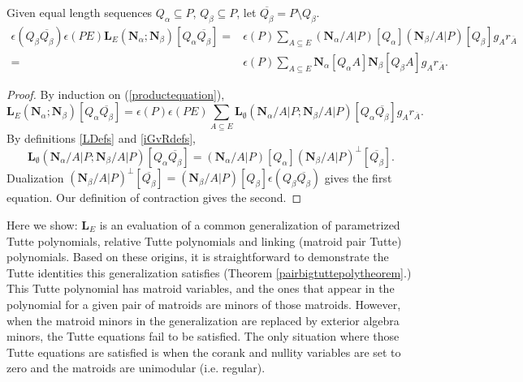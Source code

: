 \documentclass[Unicode]{cedram-alco}
\newcommand{\ext}[1]{\ensuremath{\mathbf{#1}}}
\newcommand{\eNal}{\ensuremath{\ext{N}_{\alpha}}}
\newcommand{\eNbe}{\ensuremath{\ext{N}_\beta}}
\newcommand{\extLHorSub}[3]{\ext{L}_{#1}\left(  {#2}; {#3}  \right)}
\begin{document}
\begin{coro}\label{commonbasescoro}
  Given 
  equal length sequences $Q_\alpha \subseteq P$, $Q_\beta \subseteq P$,
  let $\overline{Q_\beta}=P\setminus Q_\beta$.
\label{common-basis-expansion}
\begin{equation}
  \begin{split}
    \epsilon(  Q_\beta \overline{Q_\beta} )\epsilon(PE)
    \extLHorSub{E}{\eNal}{\eNbe}  [Q_{\alpha}\overline{Q_{\beta}}]
    =& 
    \epsilon(P)\sum_{A\subseteq E}
    (\ext{N}_\alpha/A|P) [Q_\alpha]
    (\ext{N}_\beta/A|P) [Q_\beta] g_Ar_{\overline{A}} \\
    =& 
    \epsilon(P)\sum_{A\subseteq E}
    \ext{N}_\alpha[Q_\alpha A]
    \ext{N}_\beta [Q_\beta A]
    g_Ar_{\overline{A}}.
  \end{split}
\end{equation}

\end{coro}


\begin{proof}
  By induction on (\ref{productequation}),
  \[
  \extLHorSub{E}{\eNal}{\eNbe}  [Q_{\alpha}\overline{Q_{\beta}}] = \epsilon(P)\epsilon(PE)
  \sum_{A\subseteq E}\extLHorSub{\emptyset}{\ext{N}_\alpha/A|P}{\ext{N}_\beta/A|P}[Q_{\alpha}\overline{Q_{\beta}}]
  g_Ar_{\overline{A}}.
  \]
By definitions \ref{LDefs} and \ref{iGvRdefs}, 
  \[
\extLHorSub{\emptyset}{\ext{N}_\alpha/A|P}{\ext{N}_\beta/A|P}[Q_{\alpha}\overline{Q_{\beta}}]
=(\ext{N}_\alpha/A|P)[Q_\alpha](\ext{N}_\beta/A|P)^\perp[\overline{Q_{\beta}}].
\]
Dualization
$(\ext{N}_\beta/A|P)^\perp[\overline{Q_{\beta}}]=
(\ext{N}_\beta/A|P)[Q_{\beta}]\epsilon(Q_{\beta}\overline{Q_{\beta}})$
gives the first equation.
Our definition of contraction gives the second.
\end{proof}





Here we show:  $\ext{L}_E$ is an evaluation of a common generalization
of parametrized Tutte polynomials, relative Tutte polynomials and linking
(matroid pair Tutte) polynomials.
Based on these origins, it is straightforward to demonstrate the Tutte
identities this generalization satisfies (Theorem \ref{pairbigtuttepolytheorem}.)
This Tutte polynomial has matroid
variables, and the ones that appear in the polynomial for a given
pair of matroids are minors of those matroids.
However, when the
matroid minors in the generalization are replaced by exterior algebra minors, the Tutte
equations fail to be satisfied.  The only situation where
those Tutte equations are satisfied is when the corank and nullity
variables are set to zero and the matroids are unimodular (i.e. regular).
\end{document}
